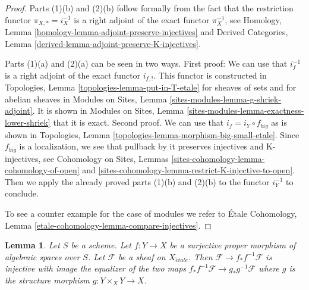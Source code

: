 \documentclass{stacks-project}
\theoremstyle{plain}
\newtheorem{lemma}[subsection]{Lemma}
\theoremstyle{definition}
\theoremstyle{remark}
\numberwithin{equation}{subsection}
\def\etale{{\acute{e}tale}}
\begin{document}
\begin{proof}
Parts (1)(b) and (2)(b)
follow formally from the fact that the restriction functor
$\pi_{X, *} = i_X^{-1}$ is a right adjoint of the exact functor
$\pi_X^{-1}$, see
Homology, Lemma \ref{homology-lemma-adjoint-preserve-injectives} and
Derived Categories, Lemma \ref{derived-lemma-adjoint-preserve-K-injectives}.

\medskip\noindent
Parts (1)(a) and (2)(a) can be seen in two ways. First proof: We can use
that $i_f^{-1}$ is a right adjoint of the exact functor $i_{f, !}$.
This functor is constructed in
Topologies, Lemma \ref{topologies-lemma-put-in-T-etale}
for sheaves of sets and for abelian sheaves in
Modules on Sites, Lemma \ref{sites-modules-lemma-g-shriek-adjoint}.
It is shown in Modules on Sites, Lemma
\ref{sites-modules-lemma-exactness-lower-shriek} that it is exact.
Second proof. We can use that $i_f = i_Y \circ f_{big}$ as is shown
in Topologies, Lemma \ref{topologies-lemma-morphism-big-small-etale}.
Since $f_{big}$ is a localization, we see that pullback by it
preserves injectives and K-injectives, see
Cohomology on Sites, Lemmas \ref{sites-cohomology-lemma-cohomology-of-open} and
\ref{sites-cohomology-lemma-restrict-K-injective-to-open}.
Then we apply the already proved parts (1)(b) and (2)(b)
to the functor $i_Y^{-1}$ to conclude.

\medskip\noindent
To see a counter example for the case of modules we refer to
\'Etale Cohomology, Lemma \ref{etale-cohomology-lemma-compare-injectives}.
\end{proof}

\begin{lemma}
\label{lemma-surjective-proper}
Let $S$ be a scheme. Let $f : Y \to X$ be a surjective proper morphism
of algebraic spaces over $S$. Let $\mathcal{F}$ be a sheaf on $X_\etale$.
Then $\mathcal{F} \to f_*f^{-1}\mathcal{F}$ is injective with
image the equalizer of the two maps
$f_*f^{-1}\mathcal{F} \to g_*g^{-1}\mathcal{F}$ where
$g$ is the structure morphism $g : Y \times_X Y \to X$.
\end{lemma}
\end{document}
